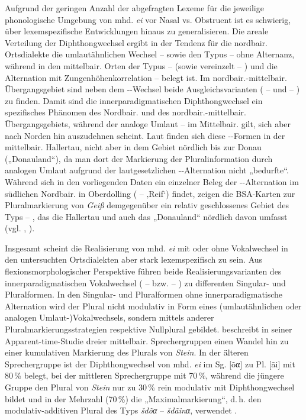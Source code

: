 Aufgrund der geringen Anzahl der abgefragten Lexeme für die jeweilige phonologische Umgebung von mhd. \textit{ei} vor Nasal vs. Obstruent ist es schwierig, über lexemspezifische Entwicklungen hinaus zu generalisieren. Die areale Verteilung der Diphthongwechsel ergibt in der Tendenz für die nordbair. Ortsdialekte die umlautähnlichen Wechsel  --  sowie den Typus  --  ohne Alternanz, während in den mittelbair. Orten der Typus  --  (sowie vereinzelt  -- ) und die Alternation mit Zungenhöhenkorrelation  --  belegt ist. Im nordbair.-mittelbair. Übergangsgebiet sind neben dem --Wechsel beide Ausgleichsvarianten ( --  und  -- ) zu finden. Damit sind die innerparadigmatischen Diphthongwechsel ein spezifisches Phänomen des Nordbair. und des nordbair.-mittelbair. Übergangsgebiets, während der analoge Umlaut  --  im Mittelbair. gilt, sich aber nach Norden hin auszudehnen scheint. Laut \citet[167]{Zehetner1978} finden sich diese --Formen in der mittelbair. Hallertau, nicht aber in dem Gebiet nördlich bis zur Donau („Donauland“), da man dort der Markierung der Pluralinformation durch analogen Umlaut aufgrund der lautgesetzlichen --Alternation nicht „bedurfte“. Während sich in den vorliegenden Daten ein einzelner Beleg der --Alternation im südlichen Nordbair. in Oberdolling ( --  ‚Reif‘) findet, zeigen die BSA-Karten zur Pluralmarkierung von \textit{Geiß} demgegenüber ein relativ geschlossenes Gebiet des Typs  -- , das die Hallertau und auch das „Donauland“ nördlich davon umfasst (vgl. \citealt[Karte 8]{SOB4}, \citealt[Karte 89/90]{SNiB7}).\largerpage

Insgesamt scheint die Realisierung von mhd. \textit{ei} mit oder ohne Vokalwechsel in den untersuchten Ortsdialekten aber stark lexemspezifisch zu sein. Aus flexionsmorphologischer Perspektive führen beide Realisierungsvarianten des innerparadigmatischen Vokalwechsel ( --  bzw.  -- ) zu differenten Singular- und Pluralformen. In den Singular- und Pluralformen ohne innerparadigmatische Alternation wird der Plural nicht modulativ in Form eines (umlautähnlichen oder analogen Umlaut-)Vokalwechsels, sondern mittels anderer Pluralmarkierungsstrategien respektive Nullplural gebildet. \citet{Wildfeuer2001} beschreibt in seiner Apparent-time-Studie dreier mittelbair. Sprechergruppen einen Wandel hin zu einer kumulativen Markierung des Plurals von \textit{Stein}. In der älteren Sprechergruppe ist der Diphthongwechsel von mhd. \textit{ei} im Sg. [õα] zu Pl. [ãi] mit 80\,\% belegt, bei der mittleren Sprechergruppe mit 70\,\%, während die jüngere Gruppe den Plural von \textit{Stein} nur zu 30\,\% rein modulativ mit Diphthongwechsel bildet und in der Mehrzahl (70\,\%) die „Maximalmarkierung“, d.\,h. den modulativ-additiven Plural des Typs \textit{šdõα} -- \textit{šdãinα}, verwendet \citep[188]{Wildfeuer2001}.

